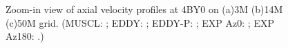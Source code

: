 \begin{figure}[t]
     \caption{Zoom-in view of axial velocity profiles at 4BY0 on (a)3M (b)14M (c)50M grid. (MUSCL: \mline; EDDY: \eline; EDDY-P: \epline; EXP Az0: \bluediam; EXP Az180: \reddiam.)}
     \label{zw}       
\end{figure}
